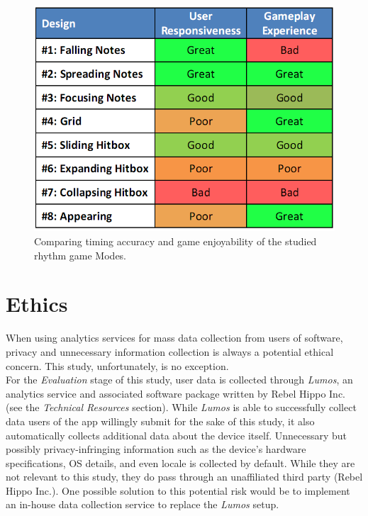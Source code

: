 \documentclass{sig-alternate}
\begin{document}
\begin{figure}[htb!]
	\begin{center}
		\includegraphics[width=0.9\linewidth]{figure_chart_results}
	\end{center}
	\vspace{-12pt}
	\caption{Comparing timing accuracy and game enjoyability of the studied rhythm game Modes.}
	\label{fig:chart_results}
\end{figure}

\section{Ethics}
\label{sec:ethics}
When using analytics services for mass data collection from users of software, privacy and unnecessary information collection is always a potential ethical concern. This study, unfortunately, is no exception. \\

For the \textit{Evaluation} stage of this study, user data is collected through \textit{Lumos}, an analytics service and associated software package written by Rebel Hippo Inc. (see the \textit{Technical Resources} section). While \textit{Lumos} is able to successfully collect data users of the app willingly submit for the sake of this study, it also automatically collects additional data about the device itself. Unnecessary but possibly privacy-infringing information such as the device's hardware specifications, OS details, and even locale is collected by default. While they are not relevant to this study, they do pass through an unaffiliated third party (Rebel Hippo Inc.). One possible solution to this potential risk would be to implement an in-house data collection service to replace the \textit{Lumos} setup.
\end{document}
